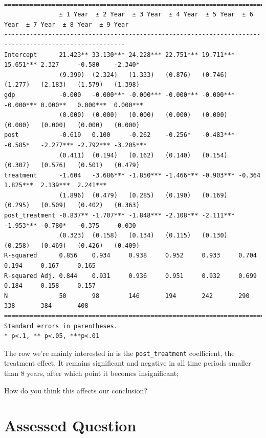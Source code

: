 \documentclass[
  letterpaper,
  DIV=11,
  numbers=noendperiod]{scrreprt}
\begin{document}
\begin{verbatim}

=======================================================================================================
               ± 1 Year  ± 2 Year  ± 3 Year  ± 4 Year  ± 5 Year  ± 6 Year  ± 7 Year  ± 8 Year  ± 9 Year
-------------------------------------------------------------------------------------------------------
Intercept      21.423** 33.130*** 24.228*** 22.751*** 19.711*** 15.651*** 2.327     -0.580    -2.340*  
               (9.399)  (2.324)   (1.333)   (0.876)   (0.746)   (1.277)   (2.183)   (1.579)   (1.398)  
gdp            -0.000   -0.000*** -0.000*** -0.000*** -0.000*** -0.000*** 0.000**   0.000***  0.000*** 
               (0.000)  (0.000)   (0.000)   (0.000)   (0.000)   (0.000)   (0.000)   (0.000)   (0.000)  
post           -0.619   0.100     -0.262    -0.256*   -0.483*** -0.585*   -2.277*** -2.792*** -3.205***
               (0.411)  (0.194)   (0.162)   (0.140)   (0.154)   (0.307)   (0.576)   (0.501)   (0.479)  
treatment      -1.604   -3.686*** -1.850*** -1.466*** -0.903*** -0.364    1.825***  2.139***  2.241*** 
               (1.896)  (0.479)   (0.285)   (0.190)   (0.169)   (0.295)   (0.509)   (0.402)   (0.363)  
post_treatment -0.837** -1.707*** -1.848*** -2.108*** -2.111*** -1.953*** -0.780*   -0.375    -0.030   
               (0.323)  (0.158)   (0.134)   (0.115)   (0.130)   (0.258)   (0.469)   (0.426)   (0.409)  
R-squared      0.856    0.934     0.938     0.952     0.933     0.704     0.194     0.167     0.165    
R-squared Adj. 0.844    0.931     0.936     0.951     0.932     0.699     0.184     0.158     0.157    
N              50       98        146       194       242       290       338       384       408      
=======================================================================================================
Standard errors in parentheses.
* p<.1, ** p<.05, ***p<.01
\end{verbatim}

The row we're mainly interested in is the \texttt{post\_treatment}
coefficient, the treatment effect. It remains significant and negative
in all time periods smaller than 8 years, after which point it becomes
insignificant;

How do you think this affects our conclusion?


\hypertarget{assessed-question-7}{%
\chapter{Assessed Question}\label{assessed-question-7}}
\end{document}
